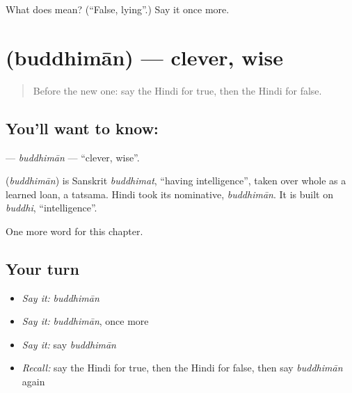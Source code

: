 \begin{tcolorbox}[breakable,colback=teal!4,colframe=teal!35!black,title={Before you move on}]
What does  mean? (\textquotedblleft{}False, lying\textquotedblright{}.) Say it once more.
\end{tcolorbox}
\section[\texorpdfstring{\hi{बुद्धिमान} (buddhimān)}{बुद्धिमान (buddhimān)}]{ (buddhimān) — clever, wise}

\label{lesson:HI-C215-buddhiman}



\begin{quote}
Before the new one: say the Hindi for true, then the Hindi for false.
\end{quote}

\subsection*{You'll want to know: }
\textbf{} — \emph{buddhimān} — \textquotedblleft{}clever, wise\textquotedblright{}.

\begin{cousinweb}
\textbf{} (\emph{buddhimān}) is Sanskrit \emph{buddhimat}, \textquotedblleft{}having intelligence\textquotedblright{}, taken over whole as a learned loan, a tatsama. Hindi took its nominative, \emph{buddhimān}. It is built on \emph{buddhi}, \textquotedblleft{}intelligence\textquotedblright{}.
\end{cousinweb}

\begin{grammarlens}[title={What you've built}]
One more word for this chapter.
\end{grammarlens}

\subsection*{Your turn}
\begin{itemize}
\raggedright
  \item \emph{Say it:} \emph{buddhimān}
  \item \emph{Say it:} \emph{buddhimān}, once more
  \item \emph{Say it:} say \emph{buddhimān}
  \item \emph{Recall:} say the Hindi for true, then the Hindi for false, then say \emph{buddhimān} again
\end{itemize}

